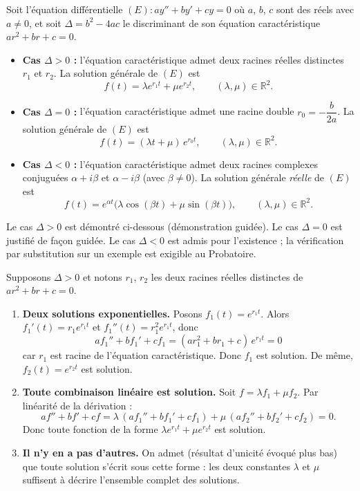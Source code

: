 \documentclass[11pt]{article}
\begin{document}
\begin{propriete}
Soit l'équation différentielle $(E) : ay'' + by' + cy = 0$ où $a$, $b$, $c$ sont des réels avec $a \neq 0$, et soit $\Delta = b^2 - 4ac$ le discriminant de son équation caractéristique $ar^2 + br + c = 0$.
\begin{itemize}
\item \textbf{Cas $\Delta > 0$ :} l'équation caractéristique admet deux racines réelles distinctes $r_1$ et $r_2$. La solution générale de $(E)$ est
\[ f(t) = \lambda e^{r_1 t} + \mu e^{r_2 t}, \qquad (\lambda, \mu) \in \mathbb{R}^2. \]
\item \textbf{Cas $\Delta = 0$ :} l'équation caractéristique admet une racine double $r_0 = -\dfrac{b}{2a}$. La solution générale de $(E)$ est
\[ f(t) = (\lambda t + \mu)\, e^{r_0 t}, \qquad (\lambda, \mu) \in \mathbb{R}^2. \]
\item \textbf{Cas $\Delta < 0$ :} l'équation caractéristique admet deux racines complexes conjuguées $\alpha + i\beta$ et $\alpha - i\beta$ (avec $\beta \neq 0$). La solution générale \emph{réelle} de $(E)$ est
\[ f(t) = e^{\alpha t}\big(\lambda \cos(\beta t) + \mu \sin(\beta t)\big), \qquad (\lambda, \mu) \in \mathbb{R}^2. \]
\end{itemize}
Le cas $\Delta > 0$ est démontré ci-dessous (démonstration guidée). Le cas $\Delta = 0$ est justifié de façon guidée. Le cas $\Delta < 0$ est admis pour l'existence ; la vérification par substitution sur un exemple est exigible au Probatoire.
\end{propriete}

\begin{experience}
Supposons $\Delta > 0$ et notons $r_1$, $r_2$ les deux racines réelles distinctes de $ar^2 + br + c = 0$.
\begin{enumerate}
\item \textbf{Deux solutions exponentielles.} Posons $f_1(t) = e^{r_1 t}$. Alors $f_1'(t) = r_1 e^{r_1 t}$ et $f_1''(t) = r_1^2 e^{r_1 t}$, donc
\[ a f_1'' + b f_1' + c f_1 = (a r_1^2 + b r_1 + c)\, e^{r_1 t} = 0 \]
car $r_1$ est racine de l'équation caractéristique. Donc $f_1$ est solution. De même, $f_2(t) = e^{r_2 t}$ est solution.
\item \textbf{Toute combinaison linéaire est solution.} Soit $f = \lambda f_1 + \mu f_2$. Par linéarité de la dérivation :
\[ a f'' + b f' + c f = \lambda\,(a f_1'' + b f_1' + c f_1) + \mu\,(a f_2'' + b f_2' + c f_2) = 0. \]
Donc toute fonction de la forme $\lambda e^{r_1 t} + \mu e^{r_2 t}$ est solution.
\item \textbf{Il n'y en a pas d'autres.} On admet (résultat d'unicité évoqué plus bas) que toute solution s'écrit sous cette forme : les deux constantes $\lambda$ et $\mu$ suffisent à décrire l'ensemble complet des solutions.
\end{enumerate}
\end{experience}
\end{document}
